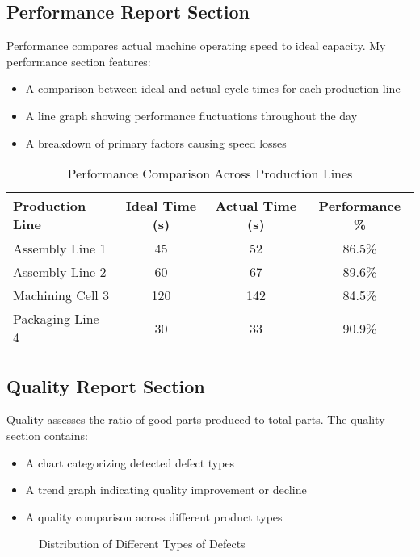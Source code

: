 \documentclass{article}
\begin{document}
\subsection{Performance Report Section}
Performance compares actual machine operating speed to ideal capacity. My performance section features:

\begin{itemize}
    \item A comparison between ideal and actual cycle times for each production line
    \item A line graph showing performance fluctuations throughout the day
    \item A breakdown of primary factors causing speed losses
\end{itemize}

\begin{table}[H]
\centering
\caption{Performance Comparison Across Production Lines}
\begin{tabular}{lccc}
\toprule
\textbf{Production Line} & \textbf{Ideal Time (s)} & \textbf{Actual Time (s)} & \textbf{Performance \%} \\
\midrule
Assembly Line 1 & 45 & 52 & 86.5\% \\
Assembly Line 2 & 60 & 67 & 89.6\% \\
Machining Cell 3 & 120 & 142 & 84.5\% \\
Packaging Line 4 & 30 & 33 & 90.9\% \\
\bottomrule
\end{tabular}
\end{table}

\subsection{Quality Report Section}
Quality assesses the ratio of good parts produced to total parts. The quality section contains:

\begin{itemize}
    \item A chart categorizing detected defect types
    \item A trend graph indicating quality improvement or decline
    \item A quality comparison across different product types
\end{itemize}

\begin{figure}[H]
\centering
{}
\caption{Distribution of Different Types of Defects}
\end{figure}
\end{document}
